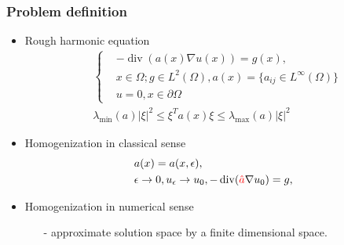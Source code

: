 \documentclass[serif,mathserif, 12pt]{beamer}
\newcommand{\TODO}[1]{\textcolor{red}{#1}}
\DeclareMathOperator{\Div}{div}
\begin{document}
\begin{frame}
  \frametitle{Problem definition}
  \begin{itemize}

  \item Rough harmonic equation
    \begin{equation*}
    \begin{split}
    &\begin{cases}
      &-\Div (a(x)\nabla u(x)) = g(x), \\
      &x\in \Omega; g\in L^2(\Omega), a(x) = \{a_{ij} \in L^\infty(\Omega)\} \\
      &u = 0, x \in \partial\Omega
    \end{cases} \\
    &\lambda_{\min}(a)|\xi|^2 \le \xi^Ta(x)\xi \le \lambda_{\max}(a)|\xi|^2
    \end{split}
    \end{equation*}
    \pause
  \item Homogenization in classical sense
    \begin{equation*}
      \begin{split}
        &a(x) = a(x, \epsilon), \\
        &\epsilon \rightarrow 0, u_\epsilon \rightarrow u_0, -\Div(\TODO{\hat a} \nabla u_0) = g,
      \end{split}
    \end{equation*}
    \pause
  \item Homogenization in numerical sense
    \begin{itemize}
    \item[-] approximate solution space by a finite dimensional space.
    \end{itemize}
  \end{itemize}
\end{frame}
\end{document}
